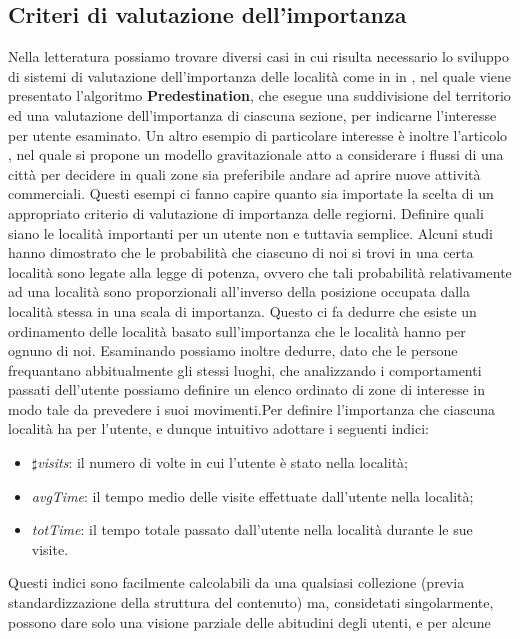 \subsection{Criteri di valutazione dell'importanza}
Nella letteratura possiamo trovare diversi casi in cui risulta necessario lo sviluppo
di sistemi di valutazione dell'importanza delle localit\`a come in in \cite{cit_42},
nel quale viene presentato l'algoritmo \textbf{Predestination}, che esegue
una suddivisione del territorio ed una valutazione dell'importanza di ciascuna
sezione, per indicarne l'interesse per utente esaminato.
Un altro esempio di particolare interesse \`e inoltre l'articolo \cite{cit_43},
nel quale si propone un modello gravitazionale atto a considerare i
flussi di una citt\`a per decidere in quali zone sia preferibile andare ad aprire
nuove attivit\`a commerciali. Questi esempi ci fanno capire quanto sia importate
la scelta di un appropriato criterio di valutazione di importanza delle regiorni.
Definire quali siano le localit\`a importanti per un utente non e tuttavia semplice.
Alcuni studi \cite{cit_44} hanno dimostrato che le probabilit\`a che ciascuno di
noi si trovi in una certa localit\`a sono legate alla legge di potenza,
ovvero che tali probabilit\`a relativamente ad una localit\`a sono proporzionali
all'inverso della posizione occupata dalla localit\`a stessa in una scala di importanza.
Questo ci fa dedurre che esiste un ordinamento delle localit\`a basato sull'importanza
che le localit\`a hanno per ognuno di noi. Esaminando \cite{cite_44} possiamo inoltre
dedurre, dato che le persone frequantano abbitualmente gli stessi luoghi, che analizzando
i comportamenti passati dell'utente possiamo definire un elenco ordinato di zone di
interesse in modo tale da prevedere i suoi movimenti.Per definire l'importanza
che ciascuna localit\`a ha per l'utente, e dunque intuitivo adottare i seguenti indici:
\begin{itemize}
\item $\sharp$\textit{visits}: il numero di volte in cui l'utente \`e stato nella localit\`a;
\item \textit{avgTime}: il tempo medio delle visite effettuate dall'utente nella localit\`a;
\item \textit{totTime}: il tempo totale passato dall'utente nella localit\`a durante le sue visite.
\end{itemize}
Questi indici sono facilmente calcolabili da una qualsiasi collezione (previa
standardizzazione della struttura del contenuto) ma, considetati singolarmente,
possono dare solo una visione parziale delle abitudini degli utenti, e per alcune
